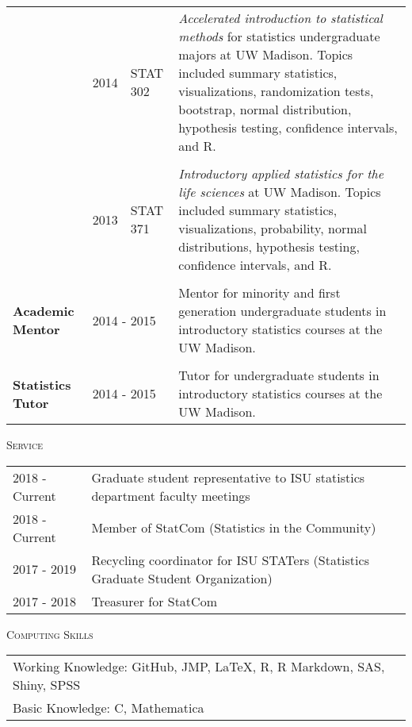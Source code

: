 \documentclass[10pt, oneside]{article}
\begin{document}
\begin{longtable}{p{2cm}p{1cm}p{2cm}p{11.5cm}}
\\
& \hfill{2014} & STAT 302 & \emph{Accelerated introduction to statistical methods} for statistics undergraduate majors at UW Madison. Topics included summary statistics, visualizations, randomization tests, bootstrap, normal distribution, hypothesis testing, confidence intervals, and R.\\
\\
& \hfill{2013} & STAT 371 & \emph{Introductory applied statistics for the life sciences} at UW Madison. Topics included summary statistics, visualizations, probability, normal distributions, hypothesis testing, confidence intervals, and R.\\
\\
\textbf{Academic Mentor} & \multicolumn{2}{p{3cm}}{\hfill{2014 - 2015}} & Mentor for minority and first generation undergraduate students in introductory statistics courses at the UW Madison.\\
\\
\textbf{Statistics Tutor} & \multicolumn{2}{p{3cm}}{\hfill{2014 - 2015}} & Tutor for undergraduate students in introductory statistics courses at the UW Madison.
\end{longtable}

\noindent \textsc{Service} \hrulefill

\begin{longtable}{p{2.5cm}p{14cm}}
\hfill{2018 - Current} & Graduate student representative to ISU statistics department faculty meetings\\
\hfill{2018 - Current} & Member of StatCom (Statistics in the Community)\\
\hfill{2017 - 2019} & Recycling coordinator for ISU STATers (Statistics Graduate Student Organization)\\
\hfill{2017 - 2018} & Treasurer for StatCom
\end{longtable}

\noindent \textsc{Computing Skills} \hrulefill

\begin{longtable}{p{16.5cm}}
Working Knowledge: GitHub, JMP, \LaTeX, R, R Markdown, SAS, Shiny, SPSS\\
Basic Knowledge: C, Mathematica
\end{longtable}
\end{document}
